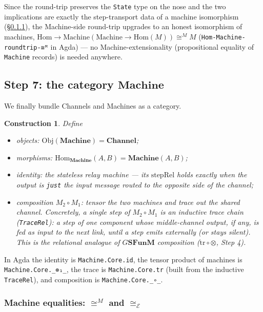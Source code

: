 \documentclass[11pt]{article}
\newtheorem{construction}[theorem]{Construction}
\newcommand{\SFunM}{\mathbf{SFunM}}
\newcommand{\Hom}{\mathrm{Hom}}
\newcommand{\Obj}{\mathrm{Obj}}
\newcommand{\stepRel}{\mathrm{stepRel}}
\newcommand{\Channel}{\mathbf{Channel}}
\newcommand{\Machine}{\mathbf{Machine}}
\begin{document}
Since the round-trip preserves the \texttt{State} type on the nose
and the two implications are exactly the step-transport data of a
machine isomorphism (\S\ref{sec:machine-iso}), the Machine-side
round-trip upgrades to an honest isomorphism of machines,
$\mathrm{Hom{\to}Machine}(\mathrm{Machine{\to}Hom}(M)) \cong^{\!M} M$
(\texttt{Hom-Machine-roundtrip-≅ᴹ} in Agda) --- no
Machine-extensionality (propositional equality of \texttt{Machine}
records) is needed anywhere.

\subsection{Step 7: the category $\Machine$}

We finally bundle Channels and Machines as a category.

\begin{construction}
Define
\begin{itemize}
  \item objects: $\Obj(\Machine) = \Channel$;
  \item morphisms: $\Hom_\Machine(A, B) = \Machine(A, B)$;
  \item identity: the stateless relay machine --- its $\stepRel$
        holds exactly when the output is \texttt{just} the input
        message routed to the opposite side of the channel;
  \item composition $M_2 \circ M_1$: tensor the two machines and trace
        out the shared channel.  Concretely, a single step of
        $M_2 \circ M_1$ is an inductive \emph{trace chain}
        (\texttt{TraceRel}): a step of one component whose
        middle-channel output, if any, is fed as input to the next
        link, until a step emits externally (or stays silent).  This
        is the relational analogue of $G\SFunM$ composition
        ($\mathrm{tr} \circ \otimes$, Step 4).
\end{itemize}
\end{construction}

In Agda the identity is \texttt{Machine.Core.id}, the tensor product
of machines is \texttt{Machine.Core.\_⊗₁\_}, the trace is
\texttt{Machine.Core.tr} (built from the inductive \texttt{TraceRel}),
and composition is \texttt{Machine.Core.\_∘\_}.

\subsubsection{Machine equalities: $\cong^{M}$ and
$\cong_\mathcal{E}$}\label{sec:machine-iso}
\end{document}
